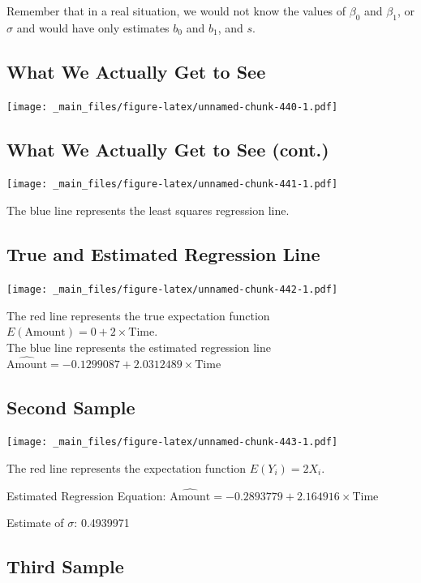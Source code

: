 \documentclass[]{book}
\begin{document}
Remember that in a real situation, we would not know the values of
\(\beta_0\) and \(\beta_1\), or \(\sigma\) and would have only estimates
\(b_0\) and \(b_1\), and \(s\).

\subsection{What We Actually Get to
See}\label{what-we-actually-get-to-see-1}

\texttt{[image: \_main\_files/figure-latex/unnamed-chunk-440-1.pdf]}

\subsection{What We Actually Get to See
(cont.)}\label{what-we-actually-get-to-see-cont.-1}

\texttt{[image: \_main\_files/figure-latex/unnamed-chunk-441-1.pdf]}

The blue line represents the least squares regression line.

\subsection{True and Estimated Regression
Line}\label{true-and-estimated-regression-line}

\texttt{[image: \_main\_files/figure-latex/unnamed-chunk-442-1.pdf]}

The red line represents the true expectation function
\(E(\text{Amount}) = 0 + 2\times\text{Time}\).\\
The blue line represents the estimated regression line
\(\widehat{\text{Amount}} = -0.1299087 + 2.0312489\times\text{Time}\)

\subsection{Second Sample}\label{second-sample}

\texttt{[image: \_main\_files/figure-latex/unnamed-chunk-443-1.pdf]}

The red line represents the expectation function \(E(Y_i) = 2X_i\).

Estimated Regression Equation:
\(\widehat{\text{Amount}} = -0.2893779 + 2.164916\times \text{Time}\)

Estimate of \(\sigma\): 0.4939971

\subsection{Third Sample}\label{third-sample}
\end{document}
